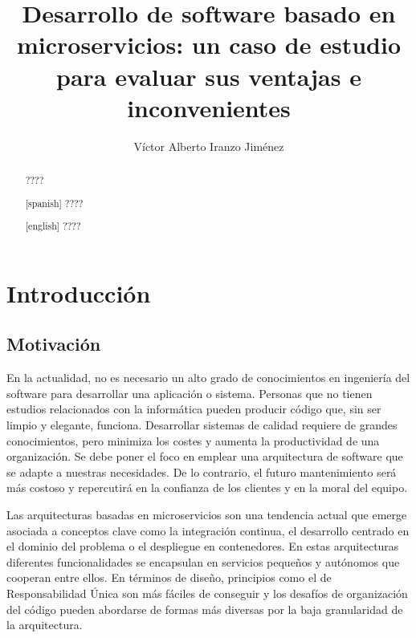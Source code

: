 \documentclass[11pt,spanish,listoffigures,listoftables]{tfgetsinf}
\title{ Desarrollo de software basado en microservicios: un caso de estudio para evaluar sus ventajas e inconvenientes }
\author{Víctor Alberto Iranzo Jiménez}
\begin{document}

\begin{abstract}
????
\end{abstract}
\begin{abstract}[spanish]
????
\end{abstract}
\begin{abstract}[english]
????
\end{abstract}


\mainmatter


\chapter{Introducci\'on}

\section{Motivaci\'on}

En la actualidad, no es necesario un alto grado de conocimientos en ingeniería del software para desarrollar una aplicación o sistema. Personas que no tienen estudios relacionados con la informática pueden producir código que, sin ser limpio y elegante, funciona. Desarrollar sistemas de calidad requiere de grandes conocimientos, pero minimiza los costes y aumenta la productividad de una organización. Se debe poner el foco en emplear una arquitectura de software que se adapte a nuestras necesidades. De lo contrario, el futuro mantenimiento será más costoso y repercutirá en la confianza de los clientes y en la moral del equipo. \cite{Martin2017}

Las arquitecturas basadas en microservicios son una tendencia actual que emerge asociada a conceptos clave como la integración continua, el desarrollo centrado en el dominio del problema o el despliegue en contenedores. En estas arquitecturas diferentes funcionalidades se encapsulan en servicios pequeños y autónomos que cooperan entre ellos. En términos de diseño, principios como el de Responsabilidad Única son más fáciles de conseguir y los desafíos de organización del código pueden abordarse de formas más diversas por la baja granularidad de la arquitectura. 
\end{document}
